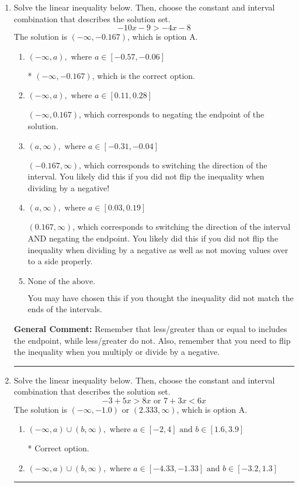 \documentclass{extbook}[14pt]
\newcommand{\litem}[1]{\item #1

\rule{\textwidth}{0.4pt}}
\begin{document}
\begin{enumerate}\litem{
Solve the linear inequality below. Then, choose the constant and interval combination that describes the solution set.
\[ -10x -9 > -4x -8 \]The solution is \( (-\infty, -0.167) \), which is option A.\begin{enumerate}[label=\Alph*.]
\item \( (-\infty, a), \text{ where } a \in [-0.57, -0.06] \)

* $(-\infty, -0.167)$, which is the correct option.
\item \( (-\infty, a), \text{ where } a \in [0.11, 0.28] \)

 $(-\infty, 0.167)$, which corresponds to negating the endpoint of the solution.
\item \( (a, \infty), \text{ where } a \in [-0.31, -0.04] \)

 $(-0.167, \infty)$, which corresponds to switching the direction of the interval. You likely did this if you did not flip the inequality when dividing by a negative!
\item \( (a, \infty), \text{ where } a \in [0.03, 0.19] \)

 $(0.167, \infty)$, which corresponds to switching the direction of the interval AND negating the endpoint. You likely did this if you did not flip the inequality when dividing by a negative as well as not moving values over to a side properly.
\item \( \text{None of the above}. \)

You may have chosen this if you thought the inequality did not match the ends of the intervals.
\end{enumerate}

\textbf{General Comment:} Remember that less/greater than or equal to includes the endpoint, while less/greater do not. Also, remember that you need to flip the inequality when you multiply or divide by a negative.
}
\litem{
Solve the linear inequality below. Then, choose the constant and interval combination that describes the solution set.
\[ -3 + 5 x > 8 x \text{ or } 7 + 3 x < 6 x \]The solution is \( (-\infty, -1.0) \text{ or } (2.333, \infty) \), which is option A.\begin{enumerate}[label=\Alph*.]
\item \( (-\infty, a) \cup (b, \infty), \text{ where } a \in [-2, 4] \text{ and } b \in [1.6, 3.9] \)

 * Correct option.
\item \( (-\infty, a) \cup (b, \infty), \text{ where } a \in [-4.33, -1.33] \text{ and } b \in [-3.2, 1.3] \)


\end{enumerate}}
\end{enumerate}
\end{document}
